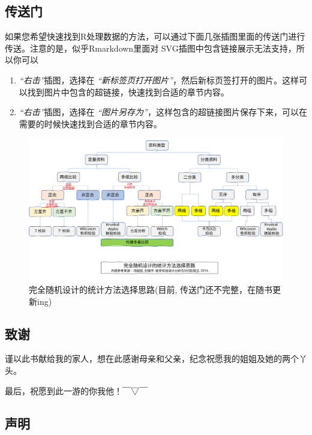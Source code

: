 \documentclass[
]{article}
\providecommand{\tightlist}{%
  \setlength{\itemsep}{0pt}\setlength{\parskip}{0pt}}
\begin{document}
\hypertarget{ux4f20ux9001ux95e8}{%
\subsection{传送门}\label{ux4f20ux9001ux95e8}}

如果您希望快速找到R处理数据的方法，可以通过下面几张插图里面的传送门进行传送。注意的是，似乎Rmarkdown里面对
SVG插图中包含链接展示无法支持，所以你可以

\begin{enumerate}
\def\labelenumi{\arabic{enumi}.}
\tightlist
\item
  \emph{``右击''}插图，选择在 \emph{``新标签页打开图片''}，然后新标页签打开的图片。这样可以找到图片中包含的超链接，快速找到合适的章节内容。
\item
  \emph{``右击''}插图，选择在 \emph{``图片另存为''}，这样包含的超链接图片保存下来，可以在需要的时候快速找到合适的章节内容。
\end{enumerate}

\begin{figure}

\includegraphics[width=0.9\linewidth]{image/ChoiceStatisticalMethods_href} \hfill{}

\caption{完全随机设计的统计方法选择思路(目前, 传送门还不完整，在随书更新ing)}\label{fig:Gateway1}
\end{figure}

\hypertarget{ux81f4ux8c22}{%
\subsection{致谢}\label{ux81f4ux8c22}}

谨以此书献给我的家人，想在此感谢母亲和父亲，纪念祝愿我的姐姐及她的两个丫头。

最后，祝愿到此一游的你我他！￣▽￣

\hypertarget{ux58f0ux660e}{%
\subsection{声明}\label{ux58f0ux660e}}
\end{document}
